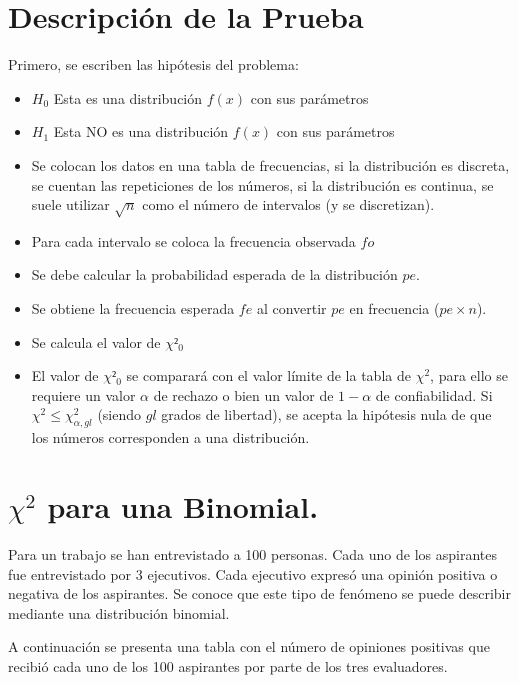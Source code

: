 \section{Descripción de la Prueba}
Primero, se escriben las hipótesis del problema:

\begin{itemize}
\item[] $H_0$ Esta es una distribución $f(x)$ con sus parámetros
\item[] $H_1$ Esta NO es una distribución $f(x)$ con sus parámetros 
\end{itemize}
\begin{itemize}
\item Se colocan los datos en una tabla de frecuencias, si la distribución es discreta, se cuentan las repeticiones de los números, si la distribución es continua, se suele utilizar $\sqrt{n}$ como el número de intervalos (y se discretizan).

\item Para cada intervalo se coloca la frecuencia observada $fo$
\item  Se debe calcular la probabilidad esperada de la distribución $pe$.
\item Se obtiene la frecuencia esperada $fe$ al convertir $pe$ en frecuencia ($pe\times n$).
\item Se calcula el valor de $\chi²_0$

\item El valor de $\chi²_0$ se comparará con el valor límite de la tabla de $\chi^2$, para ello se requiere un valor $\alpha$ de rechazo o bien un valor de $1-\alpha$ de confiabilidad. Si $\chi^2 \leq \chi^2_{\alpha,gl}$ (siendo $gl$ grados de libertad), se acepta la hipótesis nula de que los números corresponden a una distribución.
\end{itemize}

\section{$\chi^2$ para una Binomial.}

Para un trabajo se han entrevistado a 100 personas. Cada uno de los aspirantes fue entrevistado por 3 ejecutivos. Cada ejecutivo expresó una opinión positiva o negativa de los aspirantes. Se conoce que este tipo de fenómeno se puede describir mediante una distribución binomial.

A continuación se presenta una tabla con el número de opiniones positivas que recibió cada uno de los 100 aspirantes por parte de los tres evaluadores.

